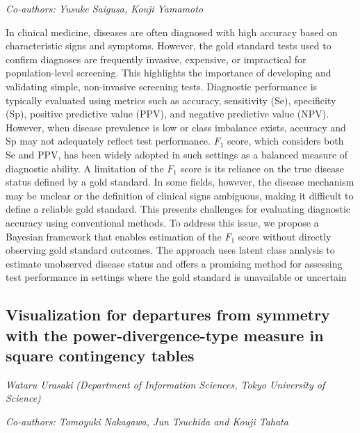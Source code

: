 \documentclass[
]{scrreprt}
\begin{document}
\emph{Co-authors: Yusuke Saigusa, Kouji Yamamoto}

\setlength{\parskip}{0.5em}

In clinical medicine, diseases are often diagnosed with high accuracy
based on characteristic signs and symptoms. However, the gold standard
tests used to confirm diagnoses are frequently invasive, expensive, or
impractical for population-level screening. This highlights the
importance of developing and validating simple, non-invasive screening
tests. Diagnostic performance is typically evaluated using metrics such
as accuracy, sensitivity (Se), specificity (Sp), positive predictive
value (PPV), and negative predictive value (NPV). However, when disease
prevalence is low or class imbalance exists, accuracy and Sp may not
adequately reflect test performance. \(F_1\) score, which considers both
Se and PPV, has been widely adopted in such settings as a balanced
measure of diagnostic ability. A limitation of the \(F_1\) score is its
reliance on the true disease status defined by a gold standard. In some
fields, however, the disease mechanism may be unclear or the definition
of clinical signs ambiguous, making it difficult to define a reliable
gold standard. This presents challenges for evaluating diagnostic
accuracy using conventional methods. To address this issue, we propose a
Bayesian framework that enables estimation of the \(F_1\) score without
directly observing gold standard outcomes. The approach uses latent
class analysis to estimate unobserved disease status and offers a
promising method for assessing test performance in settings where the
gold standard is unavailable or uncertain

\subsection{Visualization for departures from symmetry with the
power-divergence-type measure in square contingency
tables}\label{visualization-for-departures-from-symmetry-with-the-power-divergence-type-measure-in-square-contingency-tables}

\emph{Wataru Urasaki} \emph{(Department of
Information Sciences, Tokyo University of Science)}

\emph{Co-authors: Tomoyuki Nakagawa, Jun Tsuchida and Kouji Tahata}

\setlength{\parskip}{0.5em}
\end{document}
